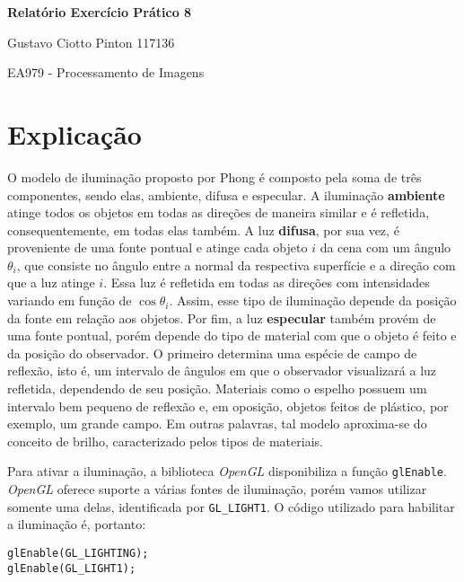 \documentclass[12pt, a4paper]{article}
\begin{document}
{\large
\centerline{\textbf{Relatório Exercício Prático 8}}
\centerline{Gustavo Ciotto Pinton 117136}
\centerline{EA979 - Processamento de Imagens}
}

\section* {Explicação}

O modelo de iluminação proposto por Phong é composto pela soma de três
componentes, sendo elas, ambiente, difusa e especular. A iluminação
\textbf{ambiente} atinge todos os objetos em todas as direções de maneira
similar e é refletida, consequentemente, em todas elas também. A luz \textbf{difusa}, por sua vez, é
proveniente de uma fonte pontual e atinge cada objeto  \(i\) da cena com um ângulo
\(\theta_i\), que consiste no ângulo entre a normal da respectiva superfície e a
direção com que a luz atinge \(i\). Essa luz é refletida em todas as direções
com intensidades variando em função de \(\cos \theta_i\). Assim, esse tipo de
iluminação depende da posição da fonte em relação aos objetos. Por fim, a luz
\textbf{especular} também provém de uma fonte pontual, porém depende do tipo de
material com que o objeto é feito e da posição do observador. O primeiro
determina uma espécie de campo de reflexão, isto é, um intervalo de ângulos em que o
observador visualizará a luz refletida, dependendo de seu posição. Materiais
como o espelho possuem um intervalo bem pequeno de reflexão e, em oposição, objetos feitos de plástico,
por exemplo, um grande campo. Em outras palavras, tal modelo aproxima-se do
conceito de brilho, caracterizado pelos tipos de materiais.

\vspace{12pt}

Para ativar a iluminação, a biblioteca \textit{OpenGL} disponibiliza a função
\texttt{glEnable}. \textit{OpenGL} oferece suporte a várias fontes de
iluminação, porém vamos utilizar somente uma delas, identificada por
\texttt{GL\_LIGHT1}. O código utilizado para habilitar a iluminação é, portanto:

\begin{lstlisting}[keywordstyle=\ttfamily, style=nonumbers]
glEnable(GL_LIGHTING);
glEnable(GL_LIGHT1);
\end{lstlisting}

\vspace{12pt}
\end{document}

